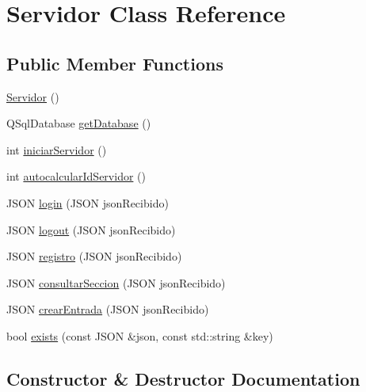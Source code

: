 \hypertarget{classServidor}{}\section{Servidor Class Reference}
\label{classServidor}
\subsection*{Public Member Functions}
\begin{DoxyCompactItemize}
\item 
\mbox{\hyperlink{classServidor_a6be6f59fd470098d8d79bfa22c378b81}{Servidor}} ()
\item 
Q\+Sql\+Database \mbox{\hyperlink{classServidor_ae784cce9d89f9f9ca0804abdb9c3c9d7}{get\+Database}} ()
\item 
int \mbox{\hyperlink{classServidor_a2a7fdca08064f9e567c579a2cb34f267}{iniciar\+Servidor}} ()
\item 
int \mbox{\hyperlink{classServidor_a292f87f595ed2afd654abe3cc5ba8dc0}{autocalcular\+Id\+Servidor}} ()
\item 
J\+S\+ON \mbox{\hyperlink{classServidor_afa99d1a7d42e43c66c066aa8d4622fbf}{login}} (J\+S\+ON json\+Recibido)
\item 
J\+S\+ON \mbox{\hyperlink{classServidor_a612baa3e7a827632a48aacdc024e2a20}{logout}} (J\+S\+ON json\+Recibido)
\item 
J\+S\+ON \mbox{\hyperlink{classServidor_adc19f6be9f624330db206a9d98c981a5}{registro}} (J\+S\+ON json\+Recibido)
\item 
J\+S\+ON \mbox{\hyperlink{classServidor_a172605658340719264d589037d2417d8}{consultar\+Seccion}} (J\+S\+ON json\+Recibido)
\item 
J\+S\+ON \mbox{\hyperlink{classServidor_a211b7b43cd2b5d81b1f21413bce9fbf2}{crear\+Entrada}} (J\+S\+ON json\+Recibido)
\item 
bool \mbox{\hyperlink{classServidor_a41f9f66959c43b27d1d13cf4f20eca55}{exists}} (const J\+S\+ON \&json, const std\+::string \&key)
\end{DoxyCompactItemize}


\subsection{Constructor \& Destructor Documentation}
\mbox{\label{classServidor_a6be6f59fd470098d8d79bfa22c378b81}} 
